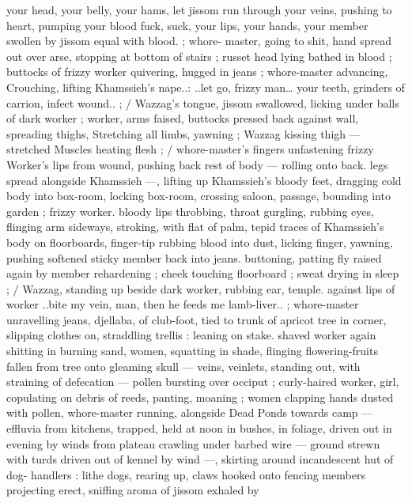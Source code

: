 your head, your belly, your hams, let jissom run through your veins, 
pushing to heart, pumping your blood{\td} fuck, suck, your lips, your 
hands, your member swollen by jissom equal with blood.{\gr} ; whore- 
master, going to shit, hand spread out over arse, stopping at bottom 
of stairs ; russet head lying bathed in blood ; buttocks of frizzy 
worker quivering, hugged in jeans ; whore-master advancing, 
Crouching, lifting Khamssieh's nape..: {\gl}..let go, frizzy man{\ldots} your 
teeth, grinders of carrion, infect wound..{\gr} ; {\slash} Wazzag's tongue, 
jissom swallowed, licking under balls of dark worker ; worker, arms 
faised, buttocks pressed back against wall, spreading thighs, 
Stretching all limbs, yawning ; Wazzag kissing thigh --- stretched 
Muscles heating flesh ; {\slash} whore-master's fingers unfastening frizzy 
Worker's lips from wound, pushing back rest of body --- rolling onto 
back. legs spread alongside Khamssieh ---, lifting up Khamssieh's 
bloody feet, dragging cold body into box-room, locking box-room, 
crossing saloon, passage, bounding into garden ; frizzy worker. 
bloody lips throbbing, throat gurgling, rubbing eyes, flinging arm 
sideways, stroking, with flat of palm, tepid traces of Khamssieh's 
body on floorboards, finger-tip rubbing blood into dust, licking 
finger, yawning, pushing softened sticky member back into jeans. 
buttoning, patting fly raised again by member rehardening ; cheek 
touching floorboard ; sweat drying in sleep ; {\slash} Wazzag, standing up 
beside dark worker, rubbing ear, temple. against lips of worker 
{\gl}..bite my vein, man, then he feeds me lamb-liver..{\gr} ; whore-master 
unravelling jeans, djellaba, of club-foot, tied to trunk of apricot tree 
in corner, slipping clothes on, straddling trellis : leaning on stake. 
shaved worker again shitting in burning sand, women, squatting in 
shade, flinging flowering-fruits fallen from tree onto gleaming skull 
--- veins, veinlets, standing out, with straining of defecation --- 
pollen bursting over occiput ; curly-haired worker, girl, copulating on 
debris of reeds, panting, moaning ; women clapping hands dusted 
with pollen, whore-master running, alongside {\gl} Dead Ponds {\gr} 
towards camp --- effluvia from kitchens, trapped, held at noon in 
bushes, in foliage, driven out in evening by winds from plateau 
crawling under barbed wire --- ground strewn with turds driven out 
of kennel by wind ---, skirting around incandescent hut of dog- 
handlers : lithe dogs, rearing up, claws hooked onto fencing 
members projecting erect, sniffing aroma of jissom exhaled by 
